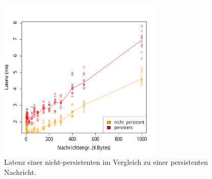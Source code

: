 \begin{figure}[t]
\center
  \includegraphics[width=0.7\textwidth]{images/measurement/persistentVsNonPersistent.pdf}
  \caption{Latenz einer nicht-persistenten im Vergleich zu einer persistenten Nachricht.}
  \label{img:senderatepersisten}
\end{figure}
